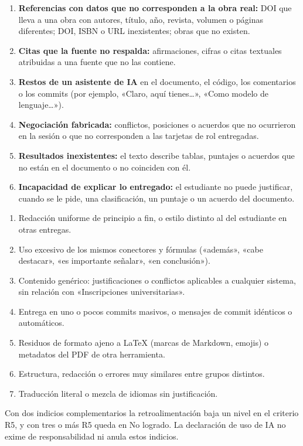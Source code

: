 \documentclass[11pt]{article}
\begin{document}
\begin{cajapiso}[title={Indicios graves de uso de IA: cada uno, por sí solo, implica NO ENTREGADA (P4)}]
	\begin{enumerate}[label=\textbf{G\arabic*.},leftmargin=24pt,itemsep=3pt]
		\item \textbf{Referencias con datos que no corresponden a la obra real:} DOI que lleva a una obra con autores, título, año, revista, volumen o páginas diferentes; DOI, ISBN o URL inexistentes; obras que no existen.
		\item \textbf{Citas que la fuente no respalda:} afirmaciones, cifras o citas textuales atribuidas a una fuente que no las contiene.
		\item \textbf{Restos de un asistente de IA} en el documento, el código, los comentarios o los commits (por ejemplo, «Claro, aquí tienes\ldots», «Como modelo de lenguaje\ldots»).
		\item \textbf{Negociación fabricada:} conflictos, posiciones o acuerdos que no ocurrieron en la sesión o que no corresponden a las tarjetas de rol entregadas.
		\item \textbf{Resultados inexistentes:} el texto describe tablas, puntajes o acuerdos que no están en el documento o no coinciden con él.
		\item \textbf{Incapacidad de explicar lo entregado:} el estudiante no puede justificar, cuando se le pide, una clasificación, un puntaje o un acuerdo del documento.
	\end{enumerate}
\end{cajapiso}

\begin{cajaaviso}[title={Indicios complementarios (se acumulan)}]
	\begin{enumerate}[label=\textbf{I\arabic*.},leftmargin=24pt,itemsep=3pt]
		\item Redacción uniforme de principio a fin, o estilo distinto al del estudiante en otras entregas.
		\item Uso excesivo de los mismos conectores y fórmulas («además», «cabe destacar», «es importante señalar», «en conclusión»).
		\item Contenido genérico: justificaciones o conflictos aplicables a cualquier sistema, sin relación con «Inscripciones universitarias».
		\item Entrega en uno o pocos commits masivos, o mensajes de commit idénticos o automáticos.
		\item Residuos de formato ajeno a \LaTeX{} (marcas de Markdown, emojis) o metadatos del PDF de otra herramienta.
		\item Estructura, redacción o errores muy similares entre grupos distintos.
		\item Traducción literal o mezcla de idiomas sin justificación.
	\end{enumerate}
	Con dos indicios complementarios la retroalimentación baja un nivel en el criterio R5, y con tres o más R5 queda en No logrado. La declaración de uso de IA no exime de responsabilidad ni anula estos indicios.
\end{cajaaviso}
\end{document}
